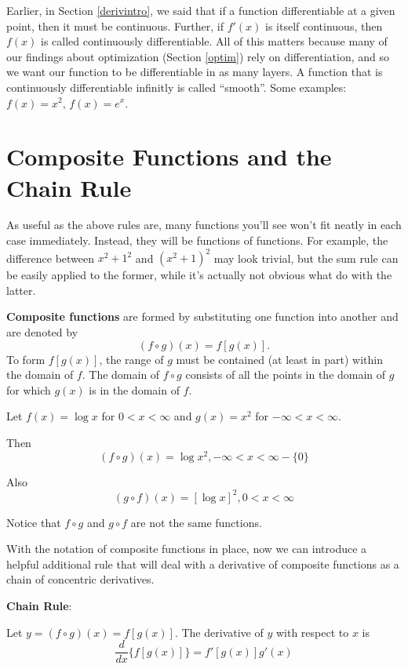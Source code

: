 \documentclass[]{book}
\theoremstyle{definition}
\theoremstyle{definition}
\theoremstyle{definition}
\theoremstyle{remark}
\let\BeginKnitrBlock\begin \let\EndKnitrBlock\end
\begin{document}
Earlier, in Section \ref{derivintro}, we said that if a function
differentiable at a given point, then it must be continuous. Further, if
\(f'(x)\) is itself continuous, then \(f(x)\) is called continuously
differentiable. All of this matters because many of our findings about
optimization (Section \ref{optim}) rely on differentiation, and so we
want our function to be differentiable in as many layers. A function
that is continuously differentiable infinitly is called ``smooth''. Some
examples: \(f(x) = x^2\), \(f(x) = e^x\).

\section{Composite Functions and the Chain
Rule}\label{composite-functions-and-the-chain-rule}

As useful as the above rules are, many functions you'll see won't fit
neatly in each case immediately. Instead, they will be functions of
functions. For example, the difference between \(x^2 + 1^2\) and
\((x^2 + 1)^2\) may look trivial, but the sum rule can be easily applied
to the former, while it's actually not obvious what do with the latter.

\textbf{Composite functions} are formed by substituting one function
into another and are denoted by \[(f\circ g)(x)=f[g(x)].\] To form
\(f[g(x)]\), the range of \(g\) must be contained (at least in part)
within the domain of \(f\). The domain of \(f\circ g\) consists of all
the points in the domain of \(g\) for which \(g(x)\) is in the domain of
\(f\).

\BeginKnitrBlock{example}
\protect\hypertarget{exm:unnamed-chunk-17}{}{\label{exm:unnamed-chunk-17}
}Let \(f(x)=\log x\) for \(0<x<\infty\) and \(g(x)=x^2\) for
\(-\infty<x<\infty\).

Then \[(f\circ g)(x)=\log x^2, -\infty<x<\infty - \{0\}\]

Also \[(g\circ f)(x)=[\log x]^2, 0<x<\infty\]

Notice that \(f\circ g\) and \(g\circ f\) are not the same functions.
\EndKnitrBlock{example}

With the notation of composite functions in place, now we can introduce
a helpful additional rule that will deal with a derivative of composite
functions as a chain of concentric derivatives.

\textbf{Chain Rule}:

Let \(y=(f\circ g)(x)= f[g(x)]\). The derivative of \(y\) with respect
to \(x\) is \[\frac{d}{dx} \{ f[g(x)] \} = f'[g(x)] g'(x)\]
\end{document}
